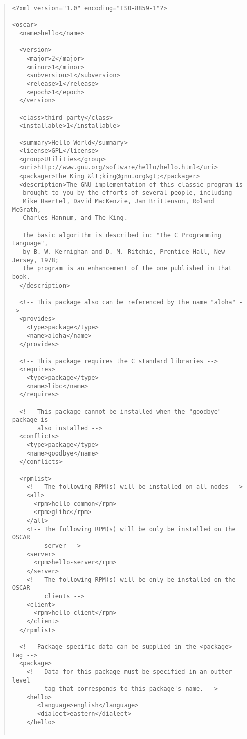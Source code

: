 \begin{quote}
 \begin{small}
 \begin{verbatim}
<?xml version="1.0" encoding="ISO-8859-1"?>

<oscar>
  <name>hello</name>

  <version>
    <major>2</major>
    <minor>1</minor>
    <subversion>1</subversion>
    <release>1</release>
    <epoch>1</epoch>
  </version>

  <class>third-party</class>
  <installable>1</installable>

  <summary>Hello World</summary>
  <license>GPL</license>
  <group>Utilities</group>
  <uri>http://www.gnu.org/software/hello/hello.html</uri>
  <packager>The King &lt;king@gnu.org&gt;</packager>
  <description>The GNU implementation of this classic program is
   brought to you by the efforts of several people, including 
   Mike Haertel, David MacKenzie, Jan Brittenson, Roland McGrath, 
   Charles Hannum, and The King.

   The basic algorithm is described in: "The C Programming Language", 
   by B. W. Kernighan and D. M. Ritchie, Prentice-Hall, New Jersey, 1978;
   the program is an enhancement of the one published in that book.  
  </description>

  <!-- This package also can be referenced by the name "aloha" -->
  <provides>
    <type>package</type>
    <name>aloha</name>
  </provides>

  <!-- This package requires the C standard libraries -->
  <requires>
    <type>package</type>
    <name>libc</name>
  </requires>

  <!-- This package cannot be installed when the "goodbye" package is
       also installed -->
  <conflicts>
    <type>package</type>
    <name>goodbye</name>
  </conflicts>

  <rpmlist>
    <!-- The following RPM(s) will be installed on all nodes -->
    <all>
      <rpm>hello-common</rpm>
      <rpm>glibc</rpm>
    </all>
    <!-- The following RPM(s) will be only be installed on the OSCAR
         server --> 
    <server>
      <rpm>hello-server</rpm>
    </server>
    <!-- The following RPM(s) will be only be installed on the OSCAR
         clients --> 
    <client>
      <rpm>hello-client</rpm>
    </client>
  </rpmlist>

  <!-- Package-specific data can be supplied in the <package> tag -->
  <package>
    <!-- Data for this package must be specified in an outter-level
         tag that corresponds to this package's name. -->
    <hello>
       <language>english</language>
       <dialect>eastern</dialect>
    </hello>


\end{verbatim}
\end{small}
\end{quote}
